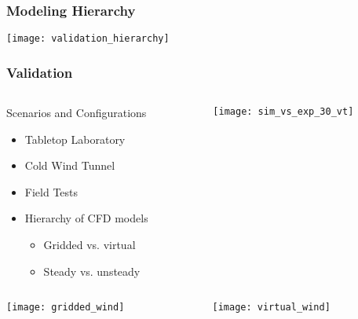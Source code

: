 \documentclass[mathserif]{beamer}
\begin{document}
%
%
%
\begin{frame}
  \frametitle{Modeling Hierarchy}

    \begin{center}
    \texttt{[image: validation\_hierarchy]}
   \end{center}

\end{frame}

%
%
%
\begin{frame}
 \frametitle{Validation}

 \begin{columns}[]
  \begin{column}{0.55\linewidth}

   \begin{block}{Scenarios and Configurations}
    \begin{itemize}
     \item Tabletop Laboratory
     \item Cold Wind Tunnel
     \item Field Tests
     \item Hierarchy of CFD models 
	   \begin{itemize}
	    \item Gridded vs. virtual
	    \item Steady vs. unsteady
	   \end{itemize}
    \end{itemize}
    \end{block}

  \end{column}

  \begin{column}{0.45\linewidth}
  \begin{center}
   \texttt{[image: sim\_vs\_exp\_30\_vt]}
  \end{center}
  \end{column}
  \end{columns}

 
 \begin{columns}[]
  \begin{column}{0.55\linewidth}
   
   \begin{center}
    \texttt{[image: gridded\_wind]}
   \end{center}
\end{column}
 \begin{column}{0.55\linewidth}
   \begin{center}
    \texttt{[image: virtual\_wind]}
   \end{center}
\end{column}
 \end{columns}


\end{frame}
\end{document}
